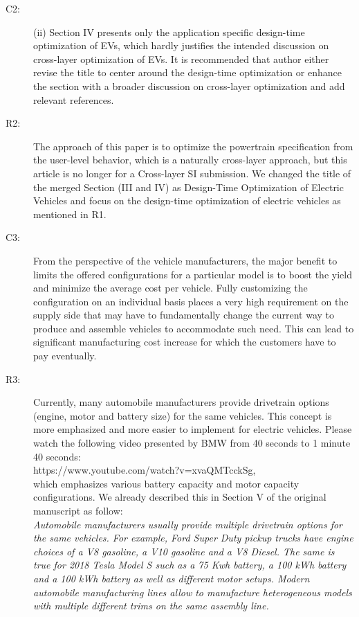 \documentclass[onecolumn]{IEEEconf}
\begin{document}
\begin{description}
\item [C2: ] (ii) Section IV presents only the application specific design-time optimization of EVs, which hardly justifies the intended discussion on cross-layer optimization of EVs. It is recommended that author either revise the title to center around the design-time optimization or enhance the section with a broader discussion on cross-layer optimization and add relevant references.
\item [R2: ]  The approach of this paper is to optimize the powertrain specification from the user-level behavior, which is a naturally cross-layer approach, but this article is no longer for a Cross-layer SI submission. We changed the title of the merged Section (III and IV) as Design-Time Optimization of Electric Vehicles and focus on the design-time optimization of electric vehicles as mentioned in R1.
~\\

\item [C3: ] From the perspective of the vehicle manufacturers, the major benefit to limits the offered configurations for a particular model is to boost the yield and minimize the average cost per vehicle. Fully customizing the configuration on an individual basis places a very high requirement on the supply side that may have to fundamentally change the current way to produce and assemble vehicles to accommodate such need. This can lead to significant manufacturing cost increase for which the customers have to pay eventually. 
\item [R3: ] Currently, many automobile manufacturers provide drivetrain options (engine, motor and battery size) for the same vehicles. This concept is more emphasized and more easier to implement for electric vehicles. Please watch the following video presented by BMW from 40 seconds to 1 minute 40 seconds: \\
https://www.youtube.com/watch?v=xvaQMTcckSg, \\
which emphasizes various battery capacity and motor capacity configurations. We already described this in Section V of the original manuscript as follow:\\

\textit{Automobile manufacturers usually provide multiple drivetrain options for the same vehicles. For example, Ford Super Duty pickup trucks have engine choices of a V8 gasoline, a V10 gasoline and a V8 Diesel. The same is true for 2018 Tesla Model S such as a 75 Kwh battery, a 100 kWh battery and a 100 kWh battery as well as different motor setups. Modern automobile manufacturing lines allow to manufacture heterogeneous models with multiple different trims on the same assembly line.}


\end{description}
\end{document}
